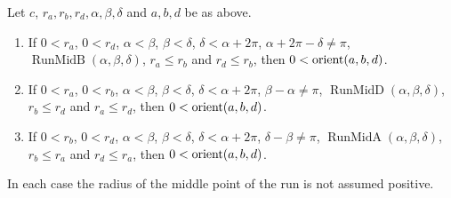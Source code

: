 \begin{theorem}\label{pc:thm:rule-run}
Let $c$, $r_a,r_b,r_d,\alpha,\beta,\delta$ and $a,b,d$ be as above.
\begin{enumerate}[label=(\Alph*)]
\item[\textup{(B)}] If $0<r_a$, $0<r_d$, $\alpha<\beta$, $\beta<\delta$, $\delta<\alpha+2\pi$,
  $\alpha+2\pi-\delta\neq\pi$, $\operatorname{RunMidB}(\alpha,\beta,\delta)$, $r_a\le r_b$ and $r_d\le r_b$, then
  $0<\operatorname{orient}(a,b,d)$.
\item[\textup{(D)}] If $0<r_a$, $0<r_b$, $\alpha<\beta$, $\beta<\delta$, $\delta<\alpha+2\pi$, $\beta-\alpha\neq\pi$,
  $\operatorname{RunMidD}(\alpha,\beta,\delta)$, $r_b\le r_d$ and $r_a\le r_d$, then $0<\operatorname{orient}(a,b,d)$.
\item[\textup{(A)}] If $0<r_b$, $0<r_d$, $\alpha<\beta$, $\beta<\delta$, $\delta<\alpha+2\pi$, $\delta-\beta\neq\pi$,
  $\operatorname{RunMidA}(\alpha,\beta,\delta)$, $r_b\le r_a$ and $r_d\le r_a$, then $0<\operatorname{orient}(a,b,d)$.
\end{enumerate}
In each case the radius of the middle point of the run is not assumed positive.
\end{theorem}


